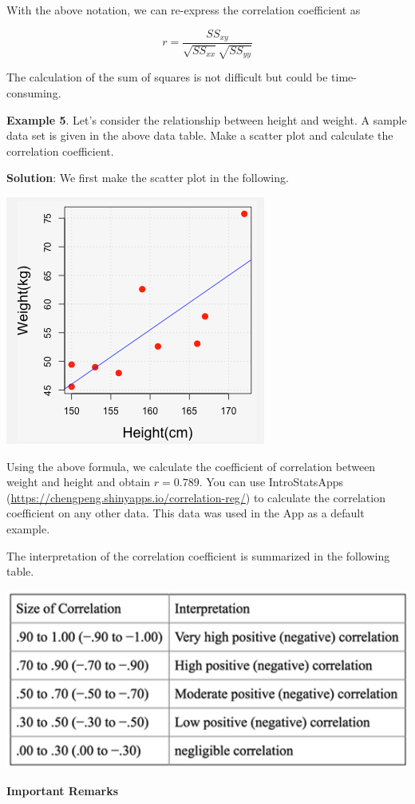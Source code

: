 \documentclass[
]{book}
\begin{document}
With the above notation, we can re-express the correlation coefficient as

\[
r = \frac{SS_{xy}}{\sqrt{SS_{xx}}\sqrt{SS_{yy}}}
\]

The calculation of the sum of squares is not difficult but could be time-consuming.

\textbf{Example 5}. Let's consider the relationship between height and weight. A sample data set is given in the above data table. Make a scatter plot and calculate the correlation coefficient.

\textbf{Solution}: We first make the scatter plot in the following.

\begin{center}\includegraphics[width=0.4\linewidth]{week12/example05} \end{center}

Using the above formula, we calculate the coefficient of correlation between weight and height and obtain \(r = 0.789\). You can use IntroStatsApps (\url{https://chengpeng.shinyapps.io/correlation-reg/}) to calculate the correlation coefficient on any other data. This data was used in the App as a default example.

The interpretation of the correlation coefficient is summarized in the following table.

\hfill\break

\begin{center}\includegraphics[width=0.6\linewidth]{week12/corrInterpretation} \end{center}

\textbf{Important Remarks}
\end{document}
